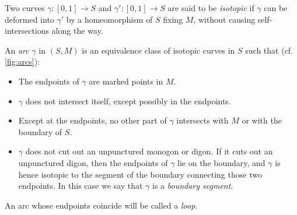\begin{definition}

	Two curves $\gamma \colon [0,1] \to S$ and $\gamma' \colon [0,1] \to S$ are said to be
	\emph{isotopic} if $\gamma$ can be deformed into $\gamma'$ by a
	homeomorphism of $S$ fixing $M$, without causing self-intersections along the way.

	An \emph{arc} $\gamma$ in $(S, M)$ is an equivalence class of isotopic
	curves in $S$ such that (cf. \cref{fig:arcs}):
	\begin{itemize}
		\item The endpoints of $\gamma$ are marked points in $M$.
		\item $\gamma$ does not intersect itself, except possibly in the endpoints.
		\item Except at the endpoints, no other part of $\gamma$ intersects with $M$ or with the
		      boundary of $S$.
		\item $\gamma$ does not cut out an unpunctured monogon or digon. If it cuts out an unpunctured digon, then the endpoints of $\gamma$ lie on the boundary, and $\gamma$ is hence isotopic to the segment of the boundary connecting those two endpoints. In this case we say that $\gamma$ is a \emph{boundary segment}.
	\end{itemize}
	An arc whose endpoints coincide will be called a \emph{loop}.
\end{definition}

